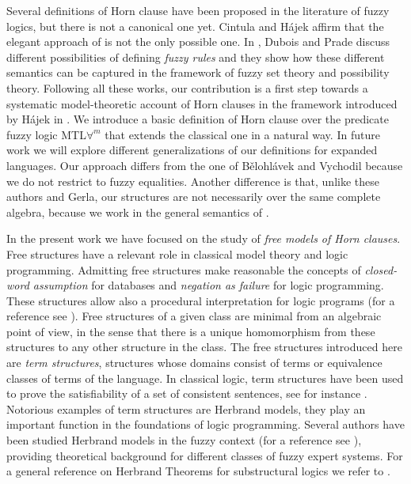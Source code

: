 \documentclass{IOS-Book-Article}
\begin{document}
Several definitions of Horn clause have been proposed in the literature of fuzzy logics, but there is not a canonical one yet. Cintula and H\'ajek affirm that the elegant approach of \cite{BeVic06} is not the only possible one. In \cite{DuPra96}, Dubois and Prade discuss different possibilities of defining \emph{fuzzy rules} and they show how these different semantics can be captured in the framework of fuzzy set theory and possibility theory. Following all these works, our contribution is a first step towards a systematic model-theoretic account of Horn clauses in the framework introduced by H\'ajek in \cite{Ha98}. We introduce a basic definition of Horn clause over the predicate fuzzy logic MTL$\forall^m$ that extends the classical one in a natural way. In future work we will explore different generalizations of our definitions for expanded languages. Our approach differs from the one of B\v{e}lohl\'avek and Vychodil because we do not restrict to fuzzy equalities. Another difference is that, unlike these authors and Gerla, our structures are not necessarily over the same complete algebra, because we work in the general semantics of \cite{Ha98}.

In the present work we have focused on the study of \emph{free models of Horn clauses}. Free structures have a relevant role in classical model theory and logic programming. Admitting free structures make reasonable the concepts of \emph{closed-word assumption} for databases and \emph{negation as failure} for logic programming. These structures allow also a procedural interpretation for logic programs (for a reference see \cite{Mak87}). Free structures of a given class are minimal from an algebraic point of view, in the sense that there is a unique homomorphism from these structures to any other structure in the class. The free structures introduced here are \emph{term structures}, structures whose domains consist of terms or equivalence classes of terms of the language. In classical logic, term structures have been used to prove the satisfiability of a set of consistent sentences, see for instance \cite[Ch.5]{EbiFlu94}. Notorious examples of term structures are Herbrand models, they play an important function in the foundations of logic programming. Several authors have been studied Herbrand models in the fuzzy context (for a reference see \cite{Ge05,Voj01,Ebra01}), providing theoretical background for different classes of fuzzy expert systems. For a general reference on Herbrand Theorems for substructural logics we refer to \cite{CiMet13}.%
\end{document}
